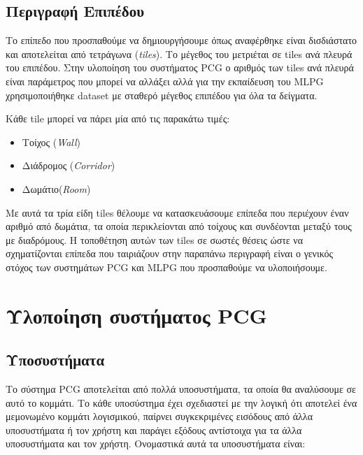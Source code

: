 \subsection{Περιγραφή Επιπέδου}
Το επίπεδο που προσπαθούμε να δημιουργήσουμε όπως αναφέρθηκε είναι δισδιάστατο και αποτελείται από τετράγωνα (\textit{tiles}). Το μέγεθος του μετριέται σε tiles ανά πλευρά του επιπέδου. Στην υλοποίηση του συστήματος PCG ο αριθμός των tiles ανά πλευρά είναι παράμετρος που μπορεί να αλλάξει αλλά για την εκπαίδευση του MLPG χρησιμοποιήθηκε dataset με σταθερό μέγεθος επιπέδου για όλα τα δείγματα.
\par
Κάθε tile μπορεί να πάρει μία από τις παρακάτω τιμές:
\begin{itemize}
\item Τοίχος (\textit{Wall})
\item Διάδρομος (\textit{Corridor})
\item Δωμάτιο(\textit{Room})
\end{itemize}

Με αυτά τα τρία είδη tiles θέλουμε να κατασκευάσουμε επίπεδα που περιέχουν έναν αριθμό από δωμάτια, τα οποία περικλείονται από τοίχους και συνδέονται μεταξύ τους με διαδρόμους. Η τοποθέτηση αυτών των tiles σε σωστές θέσεις ώστε να σχηματίζονται επίπεδα που ταιριάζουν στην παραπάνω περιγραφή είναι ο γενικός στόχος των συστημάτων PCG και MLPG που προσπαθούμε να υλοποιήσουμε.

\section{Υλοποίηση συστήματος PCG}

\subsection{Υποσυστήματα}
Το σύστημα PCG αποτελείται από πολλά υποσυστήματα, τα οποία θα αναλύσουμε σε αυτό το κομμάτι. Το κάθε υποσύστημα έχει σχεδιαστεί με την λογική ότι αποτελεί ένα μεμονωμένο κομμάτι λογισμικού, παίρνει συγκεκριμένες εισόδους από άλλα υποσυστήματα ή τον χρήστη και παράγει εξόδους αντίστοιχα για τα άλλα υποσυστήματα και τον χρήστη. Ονομαστικά αυτά τα υποσυστήματα είναι:

